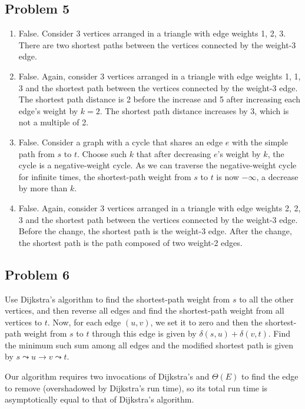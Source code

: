 \documentclass{article}
\begin{document}
\subsection*{Problem 5}

\begin{enumerate}
    \item False. Consider 3 vertices arranged in a triangle with edge weights 1, 2, 3. There are two shortest paths between the vertices connected by the weight-3 edge.
    \item False. Again, consider 3 vertices arranged in a triangle with edge weights 1, 1, 3 and the shortest path between the vertices connected by the weight-3 edge. The shortest path distance is 2 before the increase and 5 after increasing each edge's weight by $k = 2$. The shortest path distance increases by 3, which is not a multiple of 2.
    \item False. Consider a graph with a cycle that shares an edge $e$ with the simple path from $s$ to $t$. Choose such $k$ that after decreasing $e$'s weight by $k$, the cycle is a negative-weight cycle. As we can traverse the negative-weight cycle for infinite times, the shortest-path weight from $s$ to $t$ is now $-\infty$, a decrease by more than $k$.
    \item False. Again, consider 3 vertices arranged in a triangle with edge weights 2, 2, 3 and the shortest path between the vertices connected by the weight-3 edge. Before the change, the shortest path is the weight-3 edge. After the change, the shortest path is the path composed of two weight-2 edges.
\end{enumerate}

\subsection*{Problem 6}

Use Dijkstra's algorithm to find the shortest-path weight from $s$ to all the other vertices, and then reverse all edges and find the shortest-path weight from all vertices to $t$. Now, for each edge $(u, v)$, we set it to zero and then the shortest-path weight from $s$ to $t$ through this edge is given by $\delta(s, u) + \delta(v, t)$. Find the minimum such sum among all edges and the modified shortest path is given by $s \leadsto u \to v \leadsto t$.

Our algorithm requires two invocations of Dijkstra's and $\Theta(E)$ to find the edge to remove (overshadowed by Dijkstra's run time), so its total run time is asymptotically equal to that of Dijkstra's algorithm.
\end{document}
